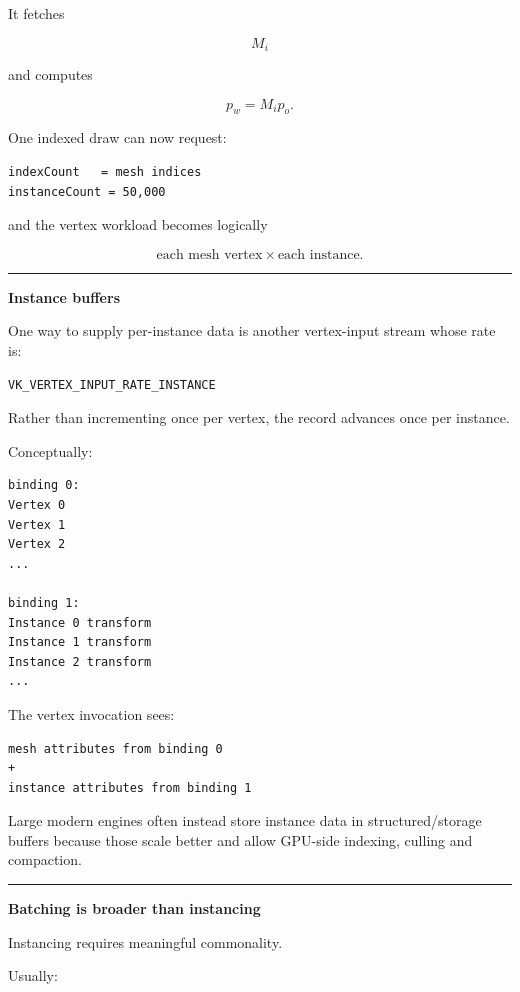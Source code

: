 It fetches

\[
M_i
\]

and computes

\[
p_w=M_i p_o.
\]

One indexed draw can now request:

\begin{verbatim}
indexCount   = mesh indices
instanceCount = 50,000
\end{verbatim}

and the vertex workload becomes logically

\[
\text{each mesh vertex}
\times
\text{each instance}.
\]

\begin{center}\rule{0.5\linewidth}{0.5pt}\end{center}

\textbf{Instance buffers}

One way to supply per-instance data is another vertex-input stream whose rate is:

\begin{verbatim}
VK_VERTEX_INPUT_RATE_INSTANCE
\end{verbatim}

Rather than incrementing once per vertex, the record advances once per instance.

Conceptually:

\begin{verbatim}
binding 0:
Vertex 0
Vertex 1
Vertex 2
...

binding 1:
Instance 0 transform
Instance 1 transform
Instance 2 transform
...
\end{verbatim}

The vertex invocation sees:

\begin{verbatim}
mesh attributes from binding 0
+
instance attributes from binding 1
\end{verbatim}

Large modern engines often instead store instance data in structured/storage buffers because those scale better and allow GPU-side indexing, culling and compaction.

\begin{center}\rule{0.5\linewidth}{0.5pt}\end{center}

\textbf{Batching is broader than instancing}

Instancing requires meaningful commonality.

Usually:

